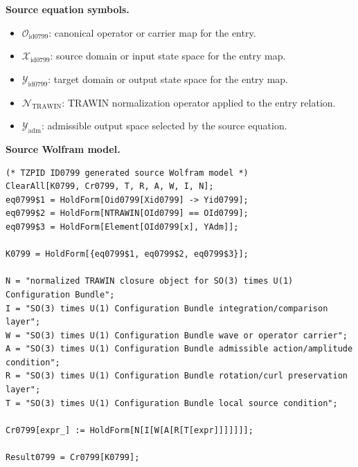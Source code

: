 \begin{minipage}[t]{0.49\linewidth}
\begingroup
\small
\raggedright
\textbf{Source equation symbols.}\par
\begin{itemize}[leftmargin=1.35em,itemsep=1pt,topsep=1pt,parsep=0pt]
    \item $\mathcal{O}_{\mathrm{id0799}}$: canonical operator or carrier map for the entry.
    \item $\mathcal{X}_{\mathrm{id0799}}$: source domain or input state space for the entry map.
    \item $\mathcal{Y}_{\mathrm{id0799}}$: target domain or output state space for the entry map.
    \item $\mathcal{N}_{\mathrm{TRAWIN}}$: TRAWIN normalization operator applied to the entry relation.
    \item $\mathcal{Y}_{\mathrm{adm}}$: admissible output space selected by the source equation.
\end{itemize}
\endgroup
\end{minipage}\hfill
\begin{minipage}[t]{0.47\linewidth}
\begingroup
\scriptsize
\raggedright
\textbf{Source Wolfram model.}\par
\begin{Verbatim}[fontsize=\tiny,breaklines=true,breakanywhere=true]
(* TZPID ID0799 generated source Wolfram model *)
ClearAll[K0799, Cr0799, T, R, A, W, I, N];
eq0799$1 = HoldForm[Oid0799[Xid0799] -> Yid0799];
eq0799$2 = HoldForm[NTRAWIN[OId0799] == OId0799];
eq0799$3 = HoldForm[Element[OId0799[x], YAdm]];

K0799 = HoldForm[{eq0799$1, eq0799$2, eq0799$3}];

N = "normalized TRAWIN closure object for SO(3) times U(1) Configuration Bundle";
I = "SO(3) times U(1) Configuration Bundle integration/comparison layer";
W = "SO(3) times U(1) Configuration Bundle wave or operator carrier";
A = "SO(3) times U(1) Configuration Bundle admissible action/amplitude condition";
R = "SO(3) times U(1) Configuration Bundle rotation/curl preservation layer";
T = "SO(3) times U(1) Configuration Bundle local source condition";

Cr0799[expr_] := HoldForm[N[I[W[A[R[T[expr]]]]]]];

Result0799 = Cr0799[K0799];
\end{Verbatim}
\endgroup
\end{minipage}

